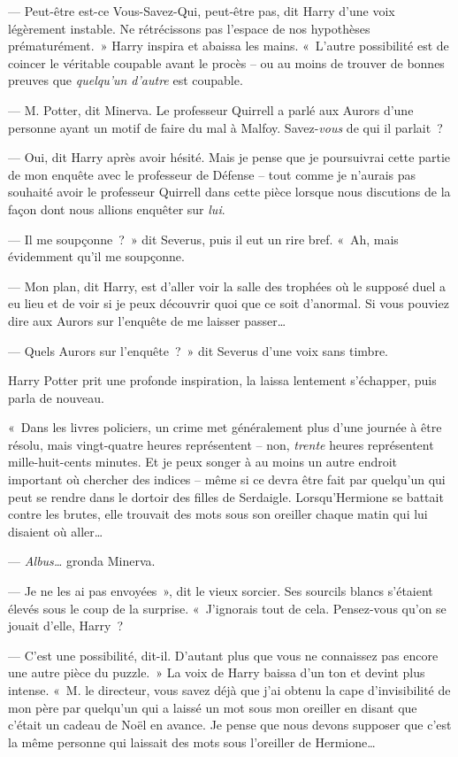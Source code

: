 --- Peut-être est-ce Vous-Savez-Qui, peut-être pas, dit Harry d'une voix légèrement instable.
Ne rétrécissons pas l'espace de nos hypothèses prématurément.~»
Harry inspira et abaissa les mains.
«~L'autre possibilité est de coincer le véritable coupable avant le procès -- ou au moins de trouver de bonnes preuves que \emph{quelqu'un d'autre} est coupable.

--- M. Potter, dit Minerva.
Le professeur Quirrell a parlé aux Aurors d'une personne ayant un motif de faire du mal à Malfoy.
Savez-\emph{vous} de qui il parlait~?

--- Oui, dit Harry après avoir hésité.
Mais je pense que je poursuivrai cette partie de mon enquête avec le professeur de Défense -- tout comme je n'aurais pas souhaité avoir le professeur Quirrell dans cette pièce lorsque nous discutions de la façon dont nous allions enquêter sur \emph{lui}.

--- Il me soupçonne~?~»
dit Severus, puis il eut un rire bref.
«~Ah, mais évidemment qu'il me soupçonne.

--- Mon plan, dit Harry, est d'aller voir la salle des trophées où le supposé duel a eu lieu et de voir si je peux découvrir quoi que ce soit d'anormal.
Si vous pouviez dire aux Aurors sur l'enquête de me laisser passer…

--- Quels Aurors sur l'enquête~?~»
dit Severus d'une voix sans timbre.

Harry Potter prit une profonde inspiration, la laissa lentement s'échapper, puis parla de nouveau.

«~Dans les livres policiers, un crime met généralement plus d'une journée à être résolu, mais vingt-quatre heures représentent -- non, \emph{trente} heures représentent mille-huit-cents minutes.
Et je peux songer à au moins un autre endroit important où chercher des indices -- même si ce devra être fait par quelqu'un qui peut se rendre dans le dortoir des filles de Serdaigle.
Lorsqu'Hermione se battait contre les brutes, elle trouvait des mots sous son oreiller chaque matin qui lui disaient où aller…

--- \emph{Albus…} gronda Minerva.

--- Je ne les ai pas envoyées~», dit le vieux sorcier.
Ses sourcils blancs s'étaient élevés sous le coup de la surprise.
«~J'ignorais tout de cela.
Pensez-vous qu'on se jouait d'elle, Harry~?

--- C'est une possibilité, dit-il.
D'autant plus que vous ne connaissez pas encore une autre pièce du puzzle.~»
La voix de Harry baissa d'un ton et devint plus intense.
«~M. le directeur, vous savez déjà que j'ai obtenu la cape d'invisibilité de mon père par quelqu'un qui a laissé un mot sous mon oreiller en disant que c'était un cadeau de Noël en avance.
Je pense que nous devons supposer que c'est la même personne qui laissait des mots sous l'oreiller de Hermione…

